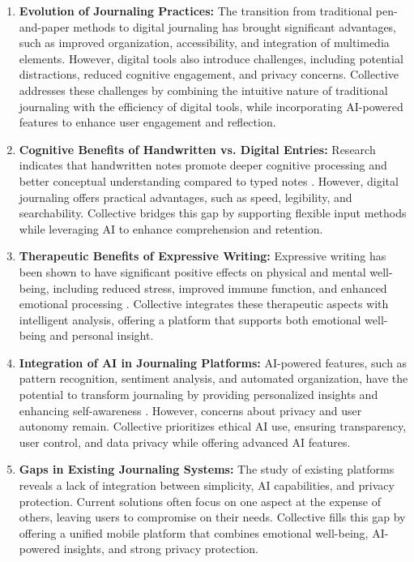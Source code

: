 \begin{enumerate}
	\item \textbf{Evolution of Journaling Practices:} The transition from traditional pen-and-paper methods to digital journaling has brought significant advantages, such as improved organization, accessibility, and integration of multimedia elements. However, digital tools also introduce challenges, including potential distractions, reduced cognitive engagement, and privacy concerns. Collective addresses these challenges by combining the intuitive nature of traditional journaling with the efficiency of digital tools, while incorporating AI-powered features to enhance user engagement and reflection.
	
	\item \textbf{Cognitive Benefits of Handwritten vs. Digital Entries:} Research indicates that handwritten notes promote deeper cognitive processing and better conceptual understanding compared to typed notes \cite{mueller2014pen}. However, digital journaling offers practical advantages, such as speed, legibility, and searchability. Collective bridges this gap by supporting flexible input methods while leveraging AI to enhance comprehension and retention.
	
	\item \textbf{Therapeutic Benefits of Expressive Writing:} Expressive writing has been shown to have significant positive effects on physical and mental well-being, including reduced stress, improved immune function, and enhanced emotional processing \cite{pennebaker1999forming}. Collective integrates these therapeutic aspects with intelligent analysis, offering a platform that supports both emotional well-being and personal insight.
	
	\item \textbf{Integration of AI in Journaling Platforms:} AI-powered features, such as pattern recognition, sentiment analysis, and automated organization, have the potential to transform journaling by providing personalized insights and enhancing self-awareness \cite{allahyari2017text}. However, concerns about privacy and user autonomy remain. Collective prioritizes ethical AI use, ensuring transparency, user control, and data privacy while offering advanced AI features.
	
	\item \textbf{Gaps in Existing Journaling Systems:} The study of existing platforms reveals a lack of integration between simplicity, AI capabilities, and privacy protection. Current solutions often focus on one aspect at the expense of others, leaving users to compromise on their needs. Collective fills this gap by offering a unified mobile platform that combines emotional well-being, AI-powered insights, and strong privacy protection.
\end{enumerate}

